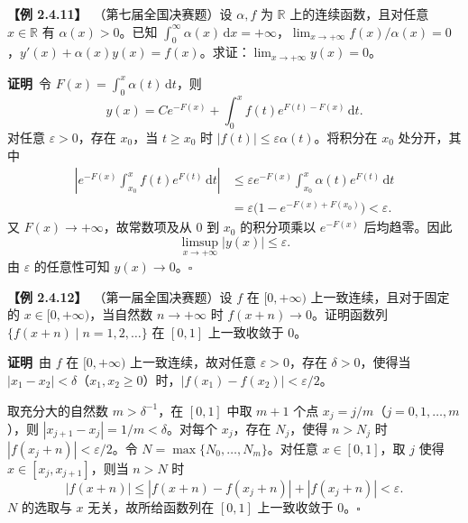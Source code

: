 \documentclass[UTF8,a4paper,11pt]{ctexart}
\newcommand{\ex}[1]{\par\medskip\noindent\textbf{【例 #1】}\ }
\newcommand{\pf}{\par\noindent\textbf{证明}\ }
\begin{document}
\ex{2.4.11}（第七届全国决赛题）设 $\alpha,f$ 为 $\mathbb R$ 上的连续函数，且对任意 $x\in\mathbb R$ 有 $\alpha(x)>0$。已知 $\int_0^\infty\alpha(x)\,\mathrm dx=+\infty$，$\lim_{x\to+\infty}f(x)/\alpha(x)=0$，$y'(x)+\alpha(x)y(x)=f(x)$。求证：$\lim_{x\to+\infty}y(x)=0$。
\pf 令 $F(x)=\int_0^x\alpha(t)\,\mathrm dt$，则
\[
y(x)=Ce^{-F(x)}+\int_0^x f(t)e^{F(t)-F(x)}\,\mathrm dt.
\]
对任意 $\varepsilon>0$，存在 $x_0$，当 $t\ge x_0$ 时 $|f(t)|\le\varepsilon\alpha(t)$。将积分在 $x_0$ 处分开，其中
\begin{align*}
\left|e^{-F(x)}\int_{x_0}^{x}f(t)e^{F(t)}\,\mathrm dt\right|
&\le\varepsilon e^{-F(x)}\int_{x_0}^{x}\alpha(t)e^{F(t)}\,\mathrm dt\\
&=\varepsilon\bigl(1-e^{-F(x)+F(x_0)}\bigr)<\varepsilon.
\end{align*}
又 $F(x)\to+\infty$，故常数项及从 $0$ 到 $x_0$ 的积分项乘以 $e^{-F(x)}$ 后均趋零。因此
\[
\limsup_{x\to+\infty}|y(x)|\le\varepsilon.
\]
由 $\varepsilon$ 的任意性可知 $y(x)\to0$。\hfill$\square$

\ex{2.4.12}（第一届全国决赛题）设 $f$ 在 $[0,+\infty)$ 上一致连续，且对于固定的 $x\in[0,+\infty)$，当自然数 $n\to+\infty$ 时 $f(x+n)\to0$。证明函数列 $\{f(x+n)\mid n=1,2,\ldots\}$ 在 $[0,1]$ 上一致收敛于 $0$。
\pf 由 $f$ 在 $[0,+\infty)$ 上一致连续，故对任意 $\varepsilon>0$，存在 $\delta>0$，使得当 $|x_1-x_2|<\delta$（$x_1,x_2\ge0$）时，$|f(x_1)-f(x_2)|<\varepsilon/2$。

取充分大的自然数 $m>\delta^{-1}$，在 $[0,1]$ 中取 $m+1$ 个点 $x_j=j/m$（$j=0,1,\ldots,m$），则 $|x_{j+1}-x_j|=1/m<\delta$。对每个 $x_j$，存在 $N_j$，使得 $n>N_j$ 时 $|f(x_j+n)|<\varepsilon/2$。令 $N=\max\{N_0,\ldots,N_m\}$。对任意 $x\in[0,1]$，取 $j$ 使得 $x\in[x_j,x_{j+1}]$，则当 $n>N$ 时
\[
|f(x+n)|\le|f(x+n)-f(x_j+n)|+|f(x_j+n)|<\varepsilon.
\]
$N$ 的选取与 $x$ 无关，故所给函数列在 $[0,1]$ 上一致收敛于 $0$。\hfill$\square$
\end{document}

